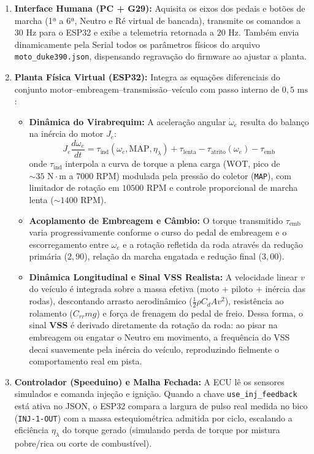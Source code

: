 \documentclass[12pt,a4paper]{article}
\begin{document}
\begin{enumerate}[itemsep=3pt]
    \item \textbf{Interface Humana (PC + G29):} Aquisita os eixos dos pedais e botões de marcha (1ª a 6ª, Neutro e Ré virtual de bancada), transmite os comandos a $30\text{ Hz}$ para o ESP32 e exibe a telemetria retornada a $20\text{ Hz}$. Também envia dinamicamente pela Serial todos os parâmetros físicos do arquivo \texttt{moto\_duke390.json}, dispensando regravação do firmware ao ajustar a planta.
    \item \textbf{Planta Física Virtual (ESP32):} Integra as equações diferenciais do conjunto motor--embreagem--transmissão--veículo com passo interno de $0{,}5\text{ ms}$:
    \begin{itemize}[itemsep=2pt]
        \item \textbf{Dinâmica do Virabrequim:} A aceleração angular $\dot{\omega}_e$ resulta do balanço na inércia do motor $J_e$:
        \begin{equation}
            J_e \frac{d\omega_e}{dt} = \tau_{\text{ind}}(\omega_e, \text{MAP}, \eta_\lambda) + \tau_{\text{lenta}} - \tau_{\text{atrito}}(\omega_e) - \tau_{\text{emb}}
        \end{equation}
        onde $\tau_{\text{ind}}$ interpola a curva de torque a plena carga (WOT, pico de $\sim 35\text{ N}\cdot\text{m}$ a $7000\text{ RPM}$) modulada pela pressão do coletor (\texttt{MAP}), com limitador de rotação em $10500\text{ RPM}$ e controle proporcional de marcha lenta ($\sim 1400\text{ RPM}$).
        \item \textbf{Acoplamento de Embreagem e Câmbio:} O torque transmitido $\tau_{\text{emb}}$ varia progressivamente conforme o curso do pedal de embreagem e o escorregamento entre $\omega_e$ e a rotação refletida da roda através da redução primária ($2{,}90$), relação da marcha engatada e redução final ($3{,}00$).
        \item \textbf{Dinâmica Longitudinal e Sinal VSS Realista:} A velocidade linear $v$ do veículo é integrada sobre a massa efetiva (moto + piloto + inércia das rodas), descontando arrasto aerodinâmico ($\frac{1}{2}\rho C_d A v^2$), resistência ao rolamento ($C_{rr} m g$) e força de frenagem do pedal de freio. Dessa forma, o sinal \textbf{VSS} é derivado diretamente da rotação da roda: ao pisar na embreagem ou engatar o Neutro em movimento, a frequência do VSS decai suavemente pela inércia do veículo, reproduzindo fielmente o comportamento real em pista.
    \end{itemize}
    \item \textbf{Controlador (Speeduino) e Malha Fechada:} A ECU lê os sensores simulados e comanda injeção e ignição. Quando a chave \texttt{use\_inj\_feedback} está ativa no JSON, o ESP32 compara a largura de pulso real medida no bico (\texttt{INJ-1-OUT}) com a massa estequiométrica admitida por ciclo, escalando a eficiência $\eta_\lambda$ do torque gerado (simulando perda de torque por mistura pobre/rica ou corte de combustível).
\end{enumerate}
\end{document}
